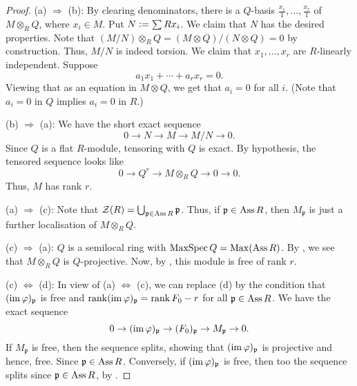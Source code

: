 \documentclass[12pt]{article}
\begin{document}
\begin{proof} 
	(a) $\Rightarrow$ (b): By clearing denominators, there is a $Q$-basis $\frac{x_{1}}{1}, \ldots, \frac{x_{r}}{1}$ of $M \otimes_{R} Q$, where $x_{i} \in M$. Put $N \vcentcolon= \sum R x_{i}$. We claim that $N$ has the desired properties. \newline 
	Note that $(M/N) \otimes_{R} Q = (M \otimes Q)/(N \otimes Q) = 0$ by construction. Thus, $M/N$ is indeed torsion. \newline
	We claim that $x_{1}, \ldots, x_{r}$ are $R$-linearly independent. Suppose 
	\begin{equation*} 
		a_{1} x_{1} + \cdots + a_{r} x_{r} = 0.
	\end{equation*}
	Viewing that as an equation in $M \otimes Q$, we get that $a_{i} = 0$ for all $i$. (Note that $a_{i} = 0$ in $Q$ implies $a_{i} = 0$ in $R$.)

	(b) $\Rightarrow$ (a): We have the short exact sequence
	\begin{equation*} 
		0 \to N \to M \to M/N \to 0.
	\end{equation*}
	Since $Q$ is a flat $R$-module, tensoring with $Q$ is exact. By hypothesis, the tensored sequence looks like
	\begin{equation*} 
		0 \to Q^{r} \to M \otimes_{R} Q \to 0 \to 0.
	\end{equation*}
	Thus, $M$ has rank $r$.

	(a) $\Rightarrow$ (c): Note that $\mathcal{Z}(R) = \bigcup_{\mathfrak{p} \in \operatorname{Ass} R} \mathfrak{p}$. Thus, if $\mathfrak{p} \in \operatorname{Ass} R$, then $M_{\mathfrak{p}}$ is just a further localisation of $M \otimes_{R} Q$.

	(c) $\Rightarrow$ (a): $Q$ is a semilocal ring with $\operatorname{MaxSpec} Q = \operatorname{Max}(\operatorname{Ass} R)$. By , we see that $M \otimes_{R} Q$ is $Q$-projective. Now, by , this module is free of rank $r$.

	(c) $\Leftrightarrow$ (d): In view of (a) $\Leftrightarrow$ (c), we can replace (d) by the condition that $(\operatorname{im} \varphi)_{\mathfrak{p}}$ is free and $\operatorname{rank}(\operatorname{im} \varphi)_{\mathfrak{p}} = \operatorname{rank} F_{0} - r$ for all $\mathfrak{p} \in \operatorname{Ass} R$. We have the exact sequence
	\begin{equation*} 
		0 \to (\operatorname{im} \varphi)_{\mathfrak{p}} \to (F_{0})_{\mathfrak{p}} \to M_{\mathfrak{p}} \to 0.
	\end{equation*}
	If $M_{\mathfrak{p}}$ is free, then the sequence splits, showing that $(\operatorname{im} \varphi)_{\mathfrak{p}}$ is projective and hence, free. Since $\mathfrak{p} \in \operatorname{Ass} R$. Conversely, if $(\operatorname{im} \varphi)_{\mathfrak{p}}$ is free, then too the sequence splits since $\mathfrak{p} \in \operatorname{Ass} R$, by .
\end{proof}
\end{document}
